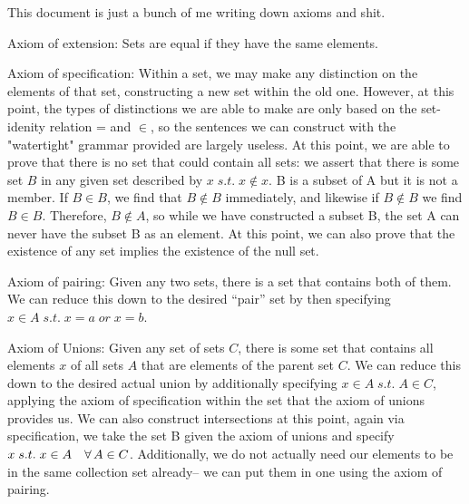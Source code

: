 \documentclass{article}
\newcommand{\nl}[0]{\newline}
\begin{document}
\begin{flushleft}

This document is just a bunch of me writing down axioms and shit. \nl

Axiom of extension: Sets are equal if they have the same elements. \nl

Axiom of specification: Within a set, we may make any distinction on the elements of that set, constructing a new set within the old one. However, at this point, the types of distinctions we are able to make are only based on the set-idenity relation = and $\in$, so the sentences we can construct with the "watertight" grammar provided are largely useless. \nl
At this point, we are able to prove that there is no set that could contain all sets: we assert that there is some set $B$ in any given set described by $x \; s.t. \; x \not \in x$. B is a subset of A but it is not a member. If $B \in B$, we find that $B \notin B$ immediately, and likewise if $B \notin B$ we find $B \in B$. Therefore, $B \notin A$, so while we have constructed a subset B, the set A can never have the subset B as an element. \nl
At this point, we can also prove that the existence of any set implies the existence of the null set. \nl

Axiom of pairing: Given any two sets, there is a set that contains both of them. We can reduce this down to the desired ``pair'' set by then specifying $x \in A \; s.t. \; x = a \; or \; x = b$. \nl

Axiom of Unions: Given any set of sets $C$, there is some set that contains all elements $x$ of all sets $A$ that are elements of the parent set $C$. We can reduce this down to the desired actual union by additionally specifying $x \in A \; s.t. \; A \in C$, applying the axiom of specification within the set that the axiom of unions provides us. \nl
We can also construct intersections at this point, again via specification, we take the set B given the axiom of unions and specify $x \; s.t. \; x \in A \kern10px \forall \, A \in C$. \nl
Additionally, we do not actually need our elements to be in the same collection set already-- we can put them in one using the axiom of pairing. \nl




\end{flushleft}
\end{document}
